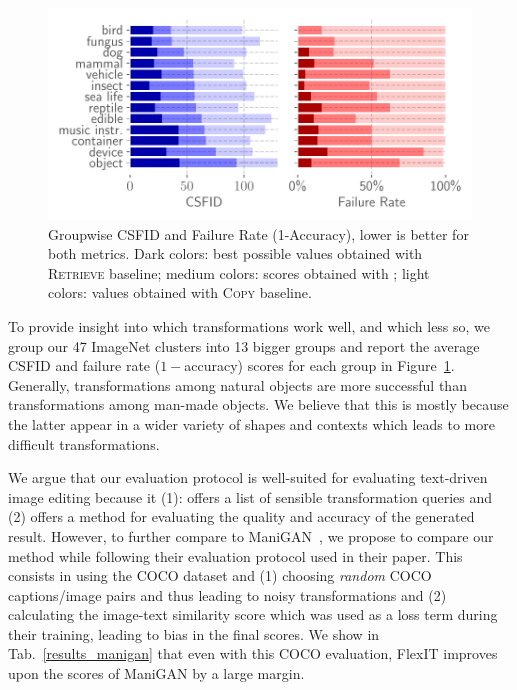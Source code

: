 \begin{figure}
    \centering
    \vspace{-1em}
    \includegraphics[width=\linewidth]{images/flexit/assets/classwise.pdf}
    \caption{Groupwise CSFID  and Failure Rate (1-Accuracy),  lower is better for both metrics. 
    Dark colors: best possible values obtained with  \textsc{Retrieve} baseline; medium colors: scores obtained with \ours; light colors: values obtained with  \textsc{Copy} baseline. 
    }
    
    \label{fig:classwise}
\end{figure}

To provide insight into which transformations work well, and which less so, we group 
our 47 ImageNet clusters into 13 bigger groups and report 
the average \ac{CSFID} and failure rate ($1 -$accuracy) scores for each group in Figure~\ref{fig:classwise}.
Generally, transformations among  natural objects are more successful than
 transformations among man-made objects. We believe that this is mostly because the 
 latter appear in a wider variety of shapes and contexts which leads to more difficult 
 transformations.


We argue that our evaluation protocol is well-suited for evaluating text-driven image editing because it 
(1): offers a list of sensible transformation queries and (2) offers a method for evaluating the quality and accuracy 
of the generated result. However, to further compare to ManiGAN~\citep{li2020manigan}, we propose to compare our method 
while following their 
evaluation protocol used in their paper. This consists in using the COCO dataset and (1) choosing 
\textit{random} COCO captions/image pairs and thus leading to noisy transformations and (2) calculating the image-text similarity
 score which was used as a loss term during their training, leading to bias in the final scores.
 We show 
 in Tab.\ \ref{results_manigan} that even with this COCO evaluation, FlexIT improves upon the scores of ManiGAN by a large margin.

